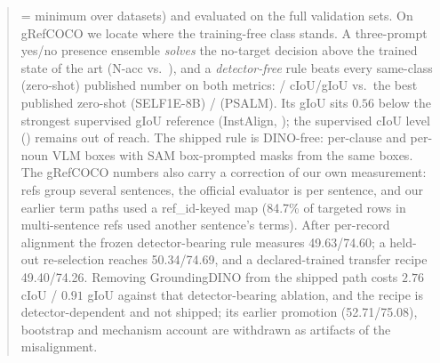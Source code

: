 \documentclass[10pt,twocolumn,letterpaper]{article}
\begin{document}
\begin{abstract}
= minimum over datasets) and evaluated on the full validation sets. On gRefCOCO we locate where the training-free class stands. A three-prompt
yes/no presence ensemble \emph{solves} the no-target decision above the
trained state of the art (N-acc \wallCombN{} vs.\ \wallTrainedNAcc{}), and a
\emph{detector-free} rule beats every same-class (zero-shot) published number
on both metrics: \grefCIoU{}/\grefGIoU{} cIoU/gIoU vs.\ the best published
zero-shot \grefZeroShotCIoU{} (SELF1E-8B) / \grefZeroShotGIoU{} (PSALM). Its
gIoU sits $0.56$ below the strongest supervised gIoU reference (InstAlign,
\grefPubGIoU); the supervised cIoU level (\grefPubCIoU) remains out of reach.
The shipped rule is DINO-free: per-clause and per-noun VLM boxes with SAM
box-prompted masks from the same boxes. The gRefCOCO numbers also carry a
correction of our own measurement: refs group several sentences, the official
evaluator is per sentence, and our earlier term paths used a ref\_id-keyed map
(84.7\% of targeted rows in multi-sentence refs used another sentence's
terms). After per-record alignment the frozen detector-bearing rule measures
49.63/74.60; a held-out re-selection reaches 50.34/74.69, and a
declared-trained transfer recipe 49.40/74.26. Removing GroundingDINO from the
shipped path costs $2.76$ cIoU / $0.91$ gIoU against that detector-bearing
ablation, and the recipe is detector-dependent and not shipped; its earlier
promotion (52.71/75.08), bootstrap and mechanism account are withdrawn as
artifacts of the misalignment.
\end{abstract}









\appendix


{\small


}
\end{document}
